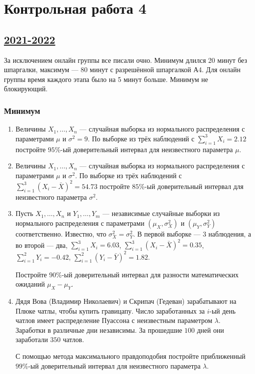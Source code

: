 
\newpage
\thispagestyle{empty}
\section{Контрольная работа 4}

\subsection[2021-2022]{\hyperref[sec:sol_kr_04_2021_2022]{2021-2022}}
\label{sec:kr_04_2021_2022}

За исключением онлайн группы все писали очно. Минимум длился 20 минут без шпаргалки, максимум — 80 минут с разрешённой шпаргалкой А4. 
Для онлайн группы время каждого этапа было на 5 минут больше. Минимум не блокирующий. 

\subsubsection*{Минимум}

\begin{enumerate}

	
	\item Величины $X_1, \ldots, X_n$ — случайная выборка из нормального распределения с параметрами $\mu$ и $\sigma^2 = 9$. 
	По выборке из трёх наблюдений с $\sum_{i=1}^3 X_i = 2.12$
	постройте $95$\%-ый доверительный интервал для неизвестного параметра $\mu$.
		
	\item Величины $X_1, \ldots, X_n$ — случайная выборка из нормального распределения с параметрами $\mu$ и $\sigma^2$. 
 	По выборке из трёх наблюдений с $\sum_{i=1}^3 (X_i - \bar X )^2 = 54.73$
	постройте $85$\%-ый доверительный интервал для неизвестного параметра $\sigma^2$.
	
	\item Пусть $X_1, \dots, X_n$ и $Y_1, \dots, Y_m$ — независимые случайные выборки из нормального распределения с параметрами $(\mu_X, \sigma_X^2)$ и $(\mu_Y, \sigma_Y^2)$ соответственно. 
	Известно, что $\sigma_X^2 = \sigma_Y^2$. В первой выборке — 3 наблюдения, а во второй — два, $\sum_{i=1}^3 X_i = 6.03$, 
	$\sum_{i=1}^3 (X_i - \bar X )^2 = 0.35$, $\sum_{i=1}^2 Y_i = -0.42$, 
	$\sum_{i=1}^2 (Y_i - \bar Y )^2 = 1.82$.
	
	Постройте $90$\%-ый доверительный интервал для разности математических ожиданий $\mu_X - \mu_Y$.
		
	\item Дядя Вова (Владимир Николаевич) и Скрипач (Гедеван) зарабатывают на Плюке чатлы, чтобы купить гравицапу. 
	Число заработанных за $i$-ый день чатлов имеет распределение Пуассона с неизвестным параметром $\lambda$. 
	Заработки в различные дни независимы. 
	За прошедшие $100$ дней они заработали $350$ чатлов.
	
	С помощью метода максимального правдоподобия постройте приближенный $99$\%-ый доверительный интервал для неизвестного параметра $\lambda$.
	
	\end{enumerate}
	

